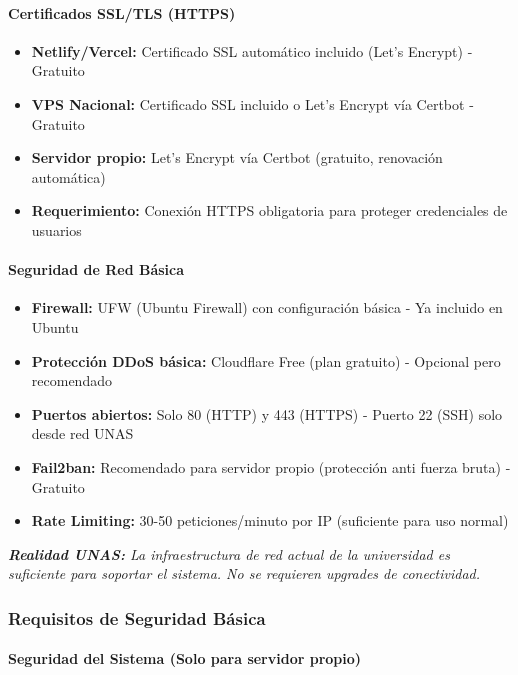 \documentclass[12pt,a4paper]{article}
\begin{document}
\paragraph{Certificados SSL/TLS (HTTPS)}

\begin{itemize}[noitemsep]
    \item \textbf{Netlify/Vercel:} Certificado SSL automático incluido (Let's Encrypt) - Gratuito
    \item \textbf{VPS Nacional:} Certificado SSL incluido o Let's Encrypt vía Certbot - Gratuito
    \item \textbf{Servidor propio:} Let's Encrypt vía Certbot (gratuito, renovación automática)
    \item \textbf{Requerimiento:} Conexión HTTPS obligatoria para proteger credenciales de usuarios
\end{itemize}

\paragraph{Seguridad de Red Básica}

\begin{itemize}[noitemsep]
    \item \textbf{Firewall:} UFW (Ubuntu Firewall) con configuración básica - Ya incluido en Ubuntu
    \item \textbf{Protección DDoS básica:} Cloudflare Free (plan gratuito) - Opcional pero recomendado
    \item \textbf{Puertos abiertos:} Solo 80 (HTTP) y 443 (HTTPS) - Puerto 22 (SSH) solo desde red UNAS
    \item \textbf{Fail2ban:} Recomendado para servidor propio (protección anti fuerza bruta) - Gratuito
    \item \textbf{Rate Limiting:} 30-50 peticiones/minuto por IP (suficiente para uso normal)
\end{itemize}

\textit{\textbf{Realidad UNAS:} La infraestructura de red actual de la universidad es suficiente para soportar el sistema. No se requieren upgrades de conectividad.}

\subsubsection{Requisitos de Seguridad Básica}

\paragraph{Seguridad del Sistema (Solo para servidor propio)}
\end{document}
